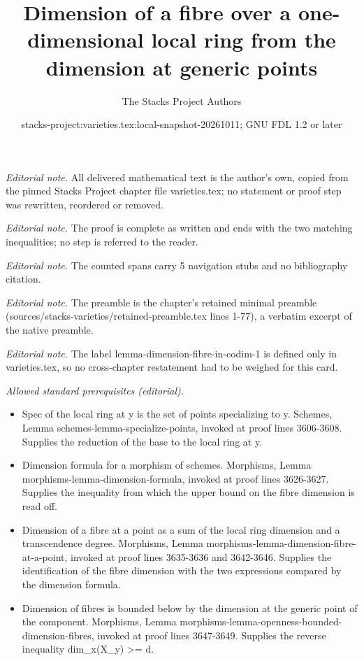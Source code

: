 \documentclass[10pt,a4paper]{amsart}
\title{Dimension of a fibre over a one-dimensional local ring from the dimension at generic points}
\author{The Stacks Project Authors}
\date{stacks-project:varieties.tex:local-snapshot-20261011; GNU FDL 1.2 or later}
\theoremstyle{plain}
\theoremstyle{definition}
\theoremstyle{remark}
\numberwithin{equation}{subsection}
\begin{document}
\maketitle
\noindent\textit{Editorial note.} All delivered mathematical text is the author's own, copied from the pinned Stacks Project chapter file varieties.tex; no statement or proof step was rewritten, reordered or removed.\par\medskip
\noindent\textit{Editorial note.} The proof is complete as written and ends with the two matching inequalities; no step is referred to the reader.\par\medskip
\noindent\textit{Editorial note.} The counted spans carry 5 navigation stubs and no bibliography citation.\par\medskip
\noindent\textit{Editorial note.} The preamble is the chapter's retained minimal preamble (sources/stacks-varieties/retained-preamble.tex lines 1-77), a verbatim excerpt of the native preamble.\par\medskip
\noindent\textit{Editorial note.} The label lemma-dimension-fibre-in-codim-1 is defined only in varieties.tex, so no cross-chapter restatement had to be weighed for this card.\par\medskip
\noindent\textit{Allowed standard prerequisites (editorial).}\begin{itemize}
\item Spec of the local ring at y is the set of points specializing to y. Schemes, Lemma schemes-lemma-specialize-points, invoked at proof lines 3606-3608. Supplies the reduction of the base to the local ring at y.
\item Dimension formula for a morphism of schemes. Morphisms, Lemma morphisms-lemma-dimension-formula, invoked at proof lines 3626-3627. Supplies the inequality from which the upper bound on the fibre dimension is read off.
\item Dimension of a fibre at a point as a sum of the local ring dimension and a transcendence degree. Morphisms, Lemma morphisms-lemma-dimension-fibre-at-a-point, invoked at proof lines 3635-3636 and 3642-3646. Supplies the identification of the fibre dimension with the two expressions compared by the dimension formula.
\item Dimension of fibres is bounded below by the dimension at the generic point of the component. Morphisms, Lemma morphisms-lemma-openness-bounded-dimension-fibres, invoked at proof lines 3647-3649. Supplies the reverse inequality dim\_x(X\_y) >= d.
\end{itemize}\medskip
\end{document}
